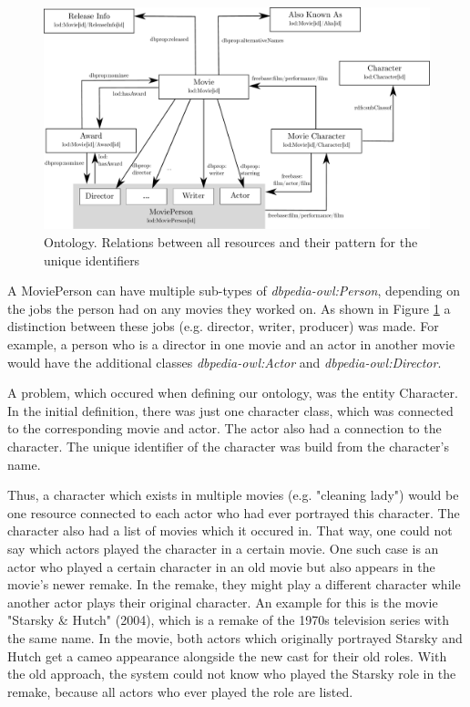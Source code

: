 \begin{figure}[h!]
\includegraphics[width=\textwidth]{images/ontology.pdf}
\caption{Ontology. Relations between all resources and their pattern for the unique identifiers}
\label{fig_ontology}
\end{figure}

A MoviePerson can have multiple sub-types of \textit{dbpedia-owl:Person}, depending on the jobs the person had on any movies they worked on.
As shown in Figure \ref{fig_ontology} a distinction between these jobs (e.g. director, writer, producer) was made.
For example, a person who is a director in one movie and an actor in another movie would have the additional classes \textit{dbpedia-owl:Actor} and \textit{dbpedia-owl:Director}.

A problem, which occured when defining our ontology, was the entity Character.
In the initial definition, there was just one character class, which was connected to the corresponding movie and actor.
The actor also had a connection to the character.
The unique identifier of the character was build from the character's name.

Thus, a character which exists in multiple movies (e.g. "cleaning lady") would be one resource connected to each actor who had ever portrayed this character.
The character also had a list of movies which it occured in.
That way, one could not say which actors played the character in a certain movie.
One such case is an actor who played a certain character in an old movie but also appears in the movie's newer remake.
In the remake, they might play a different character while another actor plays their original character.
An example for this is the movie "Starsky \& Hutch" (2004), which is a remake of the 1970s television series with the same name.
In the movie, both actors which originally portrayed Starsky and Hutch get a cameo appearance alongside the new cast for their old roles.
With the old approach, the system could not know who played the Starsky role in the remake, because all actors who ever played the role are listed.

